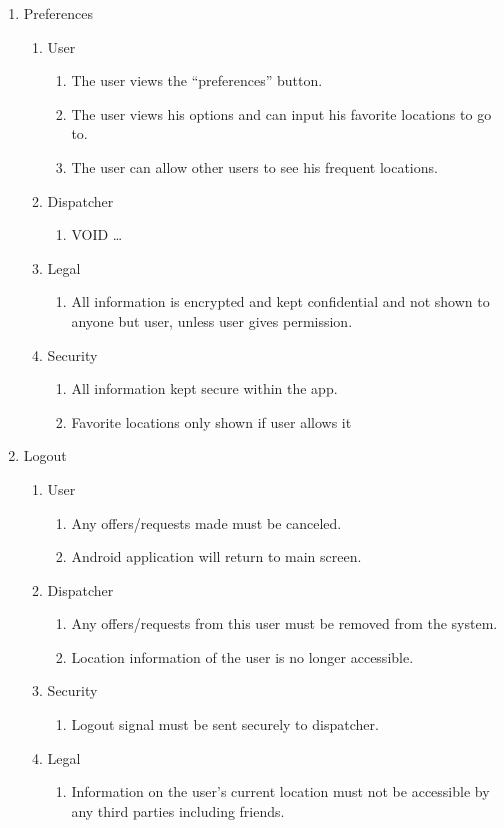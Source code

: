 \documentclass[english]{article}
\begin{document}
\begin{enumerate}[{BE}1.]
	\item Preferences 
	\begin{enumerate}[{VP10}.1]
		\item User
		\begin{enumerate}
			\item The user views the “preferences” button.
			\item The user views his options and can input his favorite locations to go to.
			\item The user can allow other users to see his frequent locations.
		\end{enumerate}
		\item Dispatcher
		\begin{enumerate}
			\item VOID
			 \dots
		\end{enumerate}
		\item Legal
		\begin{enumerate}
			\item All information is encrypted and kept confidential and not shown to anyone but user, unless user gives permission.
		\end{enumerate}
		\item Security
		\begin{enumerate}
			\item All information kept secure within the app.
			\item Favorite locations only shown if user allows it
		\end{enumerate}
	\end{enumerate}
	
	\item Logout
	\begin{enumerate}[{VP11}.1]
		\item User
			\begin{enumerate}
				\item Any offers/requests made must be canceled.
				\item Android application will return to main screen.
			\end{enumerate}
		\item Dispatcher
			\begin{enumerate}
				\item Any offers/requests from this user must be removed from the system.
				\item Location information of the user is no longer accessible.
			\end{enumerate}
		\item Security
			\begin{enumerate}
				\item Logout signal must be sent securely to dispatcher.
			\end{enumerate}
		\item Legal
			\begin{enumerate}
				\item Information on the user's current location must not be accessible by any third parties including friends.
			\end{enumerate}
	\end{enumerate}


\end{enumerate}
\end{document}
